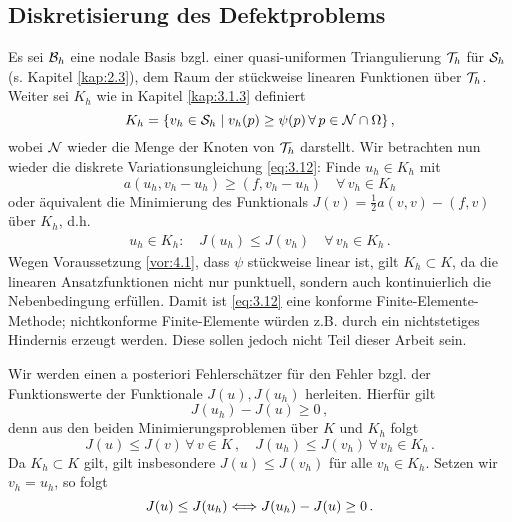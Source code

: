 \subsection{Diskretisierung des Defektproblems}
\label{kap:4.1.1}


Es sei $\mathcal B_h$ eine nodale Basis bzgl. einer quasi-uniformen Triangulierung $\mathcal T_h$  für $\mathcal S_h$ (s. Kapitel \ref{kap:2.3}), dem Raum der stückweise linearen Funktionen über $\mathcal T_h$. Weiter sei $K_h$ wie in Kapitel \ref{kap:3.1.3} definiert
\[
	K_h  = \{v_h \in \mathcal S_h \mid v_h (p) \ge \psi(p) \, \forall \, p \in \mathcal N \cap \Omega\} \, , 
\]
wobei $\mathcal N$ wieder die Menge der Knoten von $\mathcal T_h$ darstellt. Wir betrachten nun wieder die diskrete Variationsungleichung \eqref{eq:3.12}: Finde $u_h \in K_h$ mit
\[
	a(u_h,v_h-u_h) \ge (f,v_h-u_h) \quad \forall \, v_h \in K_h
\]
oder äquivalent die Minimierung des Funktionals $J(v) = \frac 1 2 a(v,v)-(f,v)$ über $K_h$, d.h.
\begin{align}\label{eq:4.1}
	u_h \in K_h :\quad J(u_h)\le J(v_h) \quad \forall \, v_h \in K_h \, .
\end{align}
Wegen  Voraussetzung \ref{vor:4.1}, dass $\psi$ stückweise linear ist, gilt $K_h \subset K$, da die linearen Ansatzfunktionen nicht nur punktuell, sondern auch kontinuierlich die Nebenbedingung erfüllen. Damit ist \eqref{eq:3.12} eine konforme Finite-Elemente-Methode; nichtkonforme Finite-Elemente würden z.B. durch ein nichtstetiges Hindernis erzeugt werden. Diese sollen jedoch nicht Teil dieser Arbeit sein.


Wir werden einen a posteriori Fehlerschätzer für den Fehler bzgl. der Funktionswerte der Funktionale $J(u),J(u_h)$ herleiten. Hierfür gilt
\[
	J(u_h) - J(u) \ge 0\, ,
\]
denn aus den beiden Minimierungsproblemen über $K$ und $K_h$ folgt
\[
	J(u) \le J(v) \, \forall \, v \in K \, , \quad J(u_h) \le J(v_h) \, \forall \, v_h \in K_h \, .
\]
Da $K_h \subset K$ gilt, gilt insbesondere $J(u)\le J(v_h)$ für alle $v_h \in K_h$. Setzen wir $v_h = u_h$, so folgt
\[
	J(u) \le J(u_h) \Longleftrightarrow J(u_h)-J(u) \ge 0 \, .
\]


